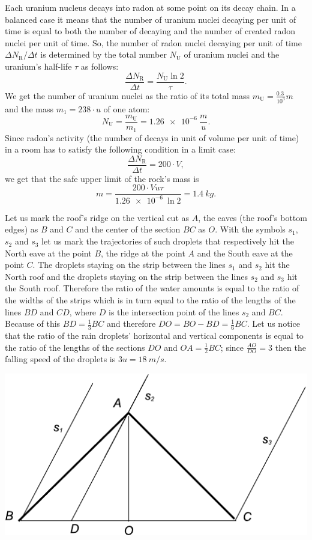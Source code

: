 \documentclass[11pt]{article}
\begin{document}
\solueng
Each uranium nucleus decays into radon at some point on its decay chain. In a balanced case it means that the number of uranium nuclei decaying per unit of time is equal to both the number of decaying and the number of created radon nuclei per unit of time. So, the number of radon nuclei decaying per unit of time $\Delta N_\text{R} / \Delta t$ is determined by the total number $N_\text{U}$ of uranium nuclei and the uranium's half-life $\tau$ as follows:
\[
\frac{\Delta N_\text{R}}{\Delta t} = \frac{N_\text{U} \ln 2}{\tau}.
\] 
We get the number of uranium nuclei as the ratio of its total mass $m_\text{U} = \frac{\SI{0.3}{}}{10^3} m$ and the mass $m_1=238 \cdot u$ of one atom:
\[
N_\text{U}=\frac{m_\text{U}}{m_1}=\SI{1.26e-6}{} \frac{m}{u}.
\] 
Since radon's activity (the number of decays in unit of volume per unit of time) in a room has to satisfy the following condition in a limit case:
\[
\frac{\Delta N_\text{R}}{\Delta t} = 200\cdot V,
\] 
we get that the safe upper limit of the rock's mass is
\[
m = \frac{200\cdot V u \tau}{\SI{1.26e-6}{}\ln 2}=\SI{1.4}{kg}.
\]
\probend
\bigskip


\solueng
Let us mark the roof's ridge on the vertical cut as $A$, the eaves (the roof's bottom edges) as $B$ and $C$ and the center of the section $BC$ as $O$. With the symbols $s_1$, $s_2$ and $s_3$ let us mark the trajectories of such droplets that respectively hit the North eave at the point $B$, the ridge at the point $A$ and the South eave at the point $C$. The droplets staying on the strip between the lines $s_1$ and $s_2$ hit the North roof and the droplets staying on the strip between the lines $s_2$ and $s_3$ hit the South roof. Therefore the ratio of the water amounts is equal to the ratio of the widths of the strips which is in turn equal to the ratio of the lengths of the lines $BD$ and $CD$, where $D$ is the intersection point of the lines $s_2$ and $BC$. Because of this $BD=\frac 13 BC$ and therefore $DO=BO-BD=\frac 16 BC$. Let us notice that the ratio of the rain droplets' horizontal and vertical components is equal to the ratio of the lengths of the sections $DO$ and $OA=\frac 12 BC$; since $\frac {AO}{DO}=3$ then the falling speed of the droplets is $3u=\SI{18}{m/s}$.
\begin{center}
\includegraphics[width=0.5\linewidth]{2012-v2g-07-katus}
\end{center}
\probend
\bigskip
\end{document}
